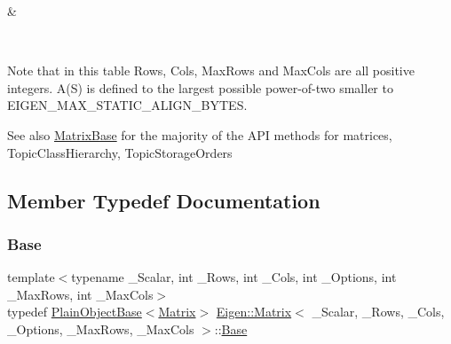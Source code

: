 \begin{longtabu}
\begin{DoxyCode}{0}
\end{DoxyCode}
&
\begin{DoxyCode}{0}
\DoxyCodeLine{\textcolor{keyword}{struct }\{}
\DoxyCodeLine{ \};}
\end{DoxyCode}
 \\
\end{longtabu}
Note that in this table Rows, Cols, Max\+Rows and Max\+Cols are all positive integers. A(\+S) is defined to the largest possible power-\/of-\/two smaller to E\+I\+G\+E\+N\+\_\+\+M\+A\+X\+\_\+\+S\+T\+A\+T\+I\+C\+\_\+\+A\+L\+I\+G\+N\+\_\+\+B\+Y\+T\+ES.

\begin{DoxySeeAlso}{See also}
\mbox{\hyperlink{class_eigen_1_1_matrix_base}{Matrix\+Base}} for the majority of the A\+PI methods for matrices, Topic\+Class\+Hierarchy, Topic\+Storage\+Orders 
\end{DoxySeeAlso}


\subsection{Member Typedef Documentation}
\mbox{\label{class_eigen_1_1_matrix_a9f405923954599ec7a71ee6bad2c53f1}} 
\subsubsection{\texorpdfstring{Base}{Base}}
{\footnotesize\ttfamily template$<$typename \+\_\+\+Scalar, int \+\_\+\+Rows, int \+\_\+\+Cols, int \+\_\+\+Options, int \+\_\+\+Max\+Rows, int \+\_\+\+Max\+Cols$>$ \\
typedef \mbox{\hyperlink{class_eigen_1_1_plain_object_base}{Plain\+Object\+Base}}$<$\mbox{\hyperlink{class_eigen_1_1_matrix}{Matrix}}$>$ \mbox{\hyperlink{class_eigen_1_1_matrix}{Eigen\+::\+Matrix}}$<$ \+\_\+\+Scalar, \+\_\+\+Rows, \+\_\+\+Cols, \+\_\+\+Options, \+\_\+\+Max\+Rows, \+\_\+\+Max\+Cols $>$\+::\mbox{\hyperlink{class_eigen_1_1_matrix_a9f405923954599ec7a71ee6bad2c53f1}{Base}}}



